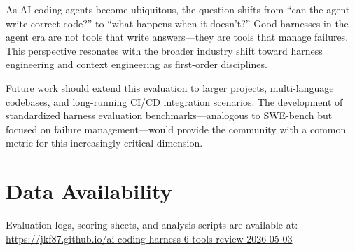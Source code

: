 \documentclass[11pt,a4paper]{article}
\begin{document}
\noindent As AI coding agents become ubiquitous, the question shifts from ``can the agent write correct code?'' to ``what happens when it doesn't?''
Good harnesses in the agent era are not tools that write answers---they are tools that manage failures.
This perspective resonates with the broader industry shift toward harness engineering \cite{atlan2026harness} and context engineering \cite{karpathy2025context} as first-order disciplines.

Future work should extend this evaluation to larger projects, multi-language codebases, and long-running CI/CD integration scenarios.
The development of standardized harness evaluation benchmarks---analogous to SWE-bench but focused on failure management---would provide the community with a common metric for this increasingly critical dimension.

\section*{Data Availability}

Evaluation logs, scoring sheets, and analysis scripts are available at:
\url{https://jkf87.github.io/ai-coding-harness-6-tools-review-2026-05-03}



\end{document}

